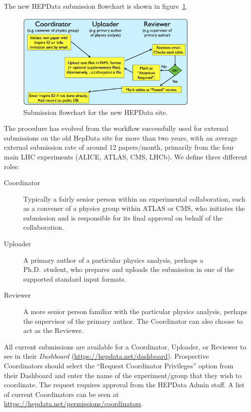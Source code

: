 \documentclass[a4paper]{jpconf}
\begin{document}
The new HEPData submission flowchart is shown in figure~\ref{fig:submission}.
%
\begin{figure}
  \begin{center}
    \includegraphics[width=0.8\textwidth]{Figures/submission_flowchart.pdf}
  \end{center}
  \caption{\label{fig:submission}Submission flowchart for the new HEPData site.}
\end{figure}
%
The procedure has evolved from the workflow successfully used for external submissions on the old HepData site for more than two years, with an average external submission rate of around 12 papers/month, primarily from the four main LHC experiments (ALICE, ATLAS, CMS, LHCb).  We define three different roles:
%
\begin{description}
\item [Coordinator] Typically a fairly senior person within an experimental collaboration, such as a convener of a physics group within ATLAS or CMS, who initiates the submission and is responsible for its final approval on behalf of the collaboration.
\item [Uploader] A primary author of a particular physics analysis, perhaps a Ph.D.~student, who prepares and uploads the submission in one of the supported standard input formats.
\item [Reviewer] A more senior person familiar with the particular physics analysis, perhaps the supervisor of the primary author.  The Coordinator can also choose to act as the Reviewer.
\end{description}
%
All current submissions are available for a Coordinator, Uploader, or Reviewer to see in their \emph{Dashboard} (\url{https://hepdata.net/dashboard}).  Prospective Coordinators should select the ``Request Coordinator Privileges'' option from their Dashboard and enter the name of the experiment/group that they wish to coordinate.  The request requires approval from the HEPData Admin staff.  A list of current Coordinators can be seen at \url{https://hepdata.net/permissions/coordinators}.
\end{document}

